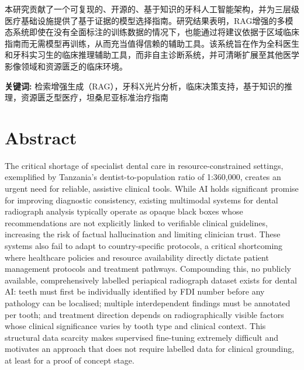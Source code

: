 \documentclass[12pt,a4paper]{report}
\begin{document}
	本研究贡献了一个可复现的、开源的、基于知识的牙科人工智能架构，并为三层级医疗基础设施提供了基于证据的模型选择指南。研究结果表明，RAG增强的多模态系统即使在没有全面标注的训练数据的情况下，也能通过将建议依据于区域临床指南而无需模型再训练，从而充当值得信赖的辅助工具。该系统旨在作为全科医生和牙科实习生的临床推理辅助工具，而非自主诊断系统，并可清晰扩展至其他医学影像领域和资源匮乏的临床环境。
	
	\vspace{1em}
	\noindent \textbf{关键词:} 检索增强生成（RAG），牙科X光片分析，临床决策支持，基于知识的推理，资源匮乏型医疗，坦桑尼亚标准治疗指南
	
	
	
	\chapter*{Abstract}
	
	The critical shortage of specialist dental care in resource-constrained
	settings, exemplified by Tanzania's dentist-to-population ratio of
	1:360,000, creates an urgent need for reliable, assistive clinical tools.
	While AI holds significant promise for improving diagnostic consistency,
	existing multimodal systems for dental radiograph analysis typically operate
	as opaque black boxes whose recommendations are not explicitly linked to
	verifiable clinical guidelines, increasing the risk of factual hallucination
	and limiting clinician trust. These systems also fail to adapt to
	country-specific protocols, a critical shortcoming where healthcare policies
	and resource availability directly dictate patient management protocols and treatment pathways. Compounding
	this, no publicly available, comprehensively labelled periapical radiograph
	dataset exists for dental AI: teeth must first be individually identified by
	FDI number before any pathology can be localised; multiple interdependent
	findings must be annotated per tooth; and treatment direction depends on
	radiographically visible factors whose clinical significance varies by tooth
	type and clinical context. This structural data scarcity makes supervised
	fine-tuning extremely difficult and motivates an approach that does not require
	labelled data for clinical grounding, at least for a proof of concept stage.
	
\end{document}
